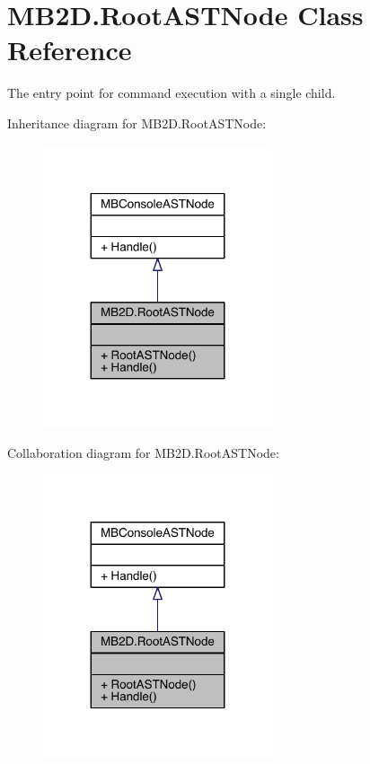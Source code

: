 \hypertarget{class_m_b2_d_1_1_root_a_s_t_node}{}\section{M\+B2\+D.\+Root\+A\+S\+T\+Node Class Reference}
\label{class_m_b2_d_1_1_root_a_s_t_node}


The entry point for command execution with a single child.  




Inheritance diagram for M\+B2\+D.\+Root\+A\+S\+T\+Node\+:
\nopagebreak
\begin{figure}[H]
\begin{center}
\leavevmode
\includegraphics[width=191pt]{class_m_b2_d_1_1_root_a_s_t_node__inherit__graph}
\end{center}
\end{figure}


Collaboration diagram for M\+B2\+D.\+Root\+A\+S\+T\+Node\+:
\nopagebreak
\begin{figure}[H]
\begin{center}
\leavevmode
\includegraphics[width=191pt]{class_m_b2_d_1_1_root_a_s_t_node__coll__graph}
\end{center}
\end{figure}
